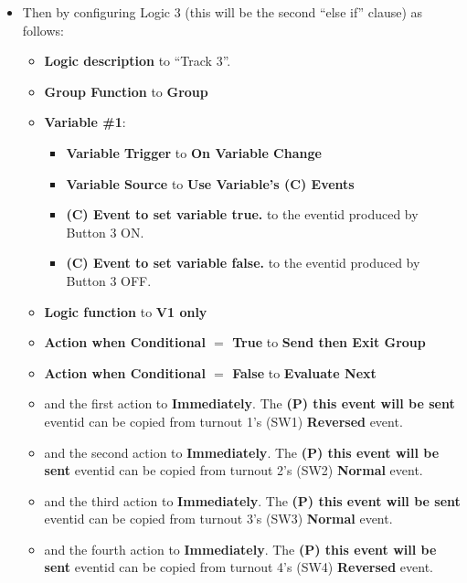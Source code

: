\begin{itemize}
\item Then by configuring Logic 3 (this will be the second ``else if'' clause) 
as follows:
\begin{itemize}
\item \textbf{Logic description} to ``Track 3''.
\item \textbf{Group Function} to \textbf{Group}
\item \textbf{Variable \#1}:
\begin{itemize}
\item \textbf{Variable Trigger} to \textbf{On Variable Change}
\item \textbf{Variable Source} to \textbf{Use Variable's (C) Events}
\item \textbf{(C) Event to set variable true.} to the eventid produced by 
Button 3 ON.
\item \textbf{(C) Event to set variable false.} to the eventid produced by 
Button 3 OFF.
\end{itemize}
\item \textbf{Logic function} to \textbf{V1 only}
\item \textbf{Action when Conditional $=$ True} to \textbf{Send then Exit 
Group}
\item \textbf{Action when Conditional $=$ False} to \textbf{Evaluate Next}
\item and the first action to \textbf{Immediately}.  The \textbf{(P) this 
event will be sent} eventid can be copied from turnout 1's (SW1) 
\textbf{Reversed} event.
\item and the second action to \textbf{Immediately}.  The \textbf{(P) this 
event will be sent} eventid can be copied from turnout 2's (SW2) 
\textbf{Normal} event.
\item and the third action to \textbf{Immediately}.  The \textbf{(P) this 
event will be sent} eventid can be copied from turnout 3's (SW3) 
\textbf{Normal} event.
\item and the fourth action to \textbf{Immediately}.  The \textbf{(P) this 
event will be sent} eventid can be copied from turnout 4's (SW4) 
\textbf{Reversed} event.
\end{itemize}


\end{itemize}
